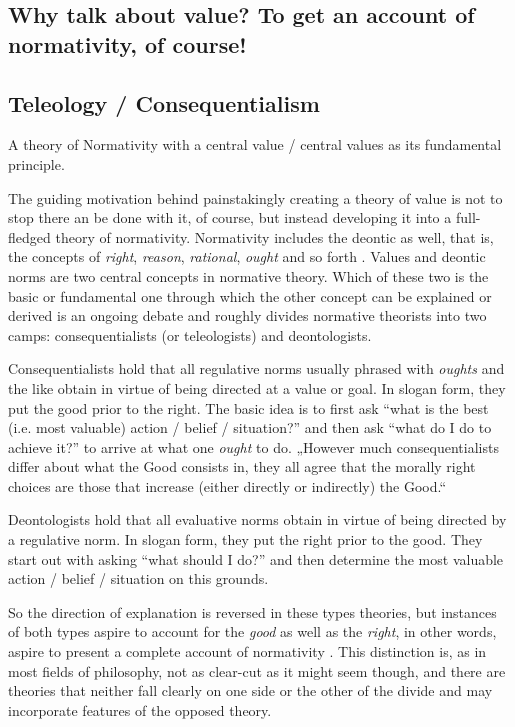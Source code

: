 \documentclass[12pt,numbers=noenddot]{scrartcl}
\begin{document}
\subsection{ Why talk about value? To get an account of normativity, of course! }

\subsection{ Teleology / Consequentialism} \label{subsec: teleology}
A theory of Normativity with a central value / central values as its fundamental principle.

The guiding motivation behind painstakingly creating a theory of value is not to stop there an be done with it, of course, but instead developing it into a 
full-fledged theory of normativity. Normativity includes the deontic as well, that is, the concepts of \emph{right}, \emph{reason}, \emph{rational}, \emph{ought} and so forth \autocite[21]{sep-value-theory}. Values and deontic norms are two central concepts in normative theory. Which of these two is the basic or fundamental one through which the other concept can be explained or derived is an ongoing debate and roughly divides normative theorists into two camps: consequentialists (or teleologists) and deontologists. 

Consequentialists hold that all regulative norms usually phrased with \emph{oughts} and the like obtain in virtue of being directed at a value or goal. In slogan form, they put the good prior to the right. The basic idea is to first ask “what is the best (i.e. most valuable) action / belief / situation?” and then ask “what do I do to achieve it?” to arrive at what one \emph{ought} to do. „However much consequentialists differ about what the Good consists in, they all agree that the morally right choices are those that increase (either directly or indirectly) the Good.“ \autocite{sep-ethics-deontological}

Deontologists hold that all evaluative norms obtain in virtue of being directed by a regulative norm. In slogan form, they put the right prior to the good. They start out with asking “what should I do?” and then determine the most valuable action / belief / situation on this grounds. 

So the direction of explanation is reversed in these types theories, but instances of both types aspire to account for the \emph{good} as well as the \emph{right}, in other words, aspire to present a complete account of normativity \parencite[341]{Berker2013-BERETA-2}. This distinction is, as in most fields of philosophy, not as clear-cut as it might seem though, and there are theories that neither fall clearly on one side or the other of the divide and may incorporate features of the opposed theory.
\end{document}
